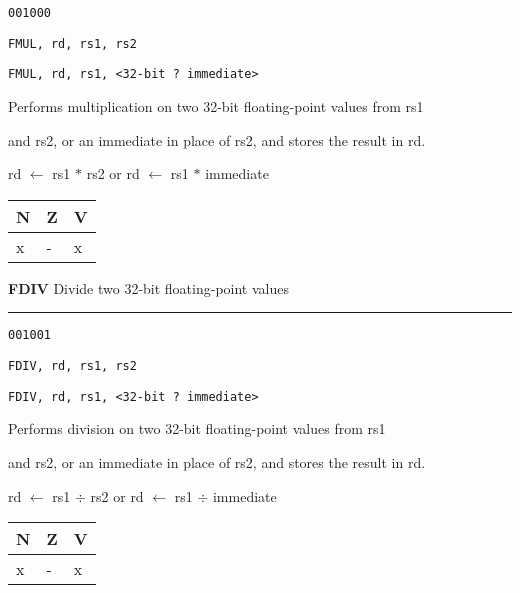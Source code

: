 \documentclass{article}
\begin{document}
{\large
	 \texttt{001000} \par
	\smallbreak
	 \texttt{FMUL, rd, rs1, rs2} \par
	\smallbreak
	 \texttt{FMUL, rd, rs1, <32-bit ? immediate>} \par
	\smallbreak
	 Performs multiplication on two 32-bit floating-point values from rs1 \par
	\makebox[3.5cm][l]{  } and rs2, or an immediate in place of rs2, and stores the result in rd. \par
	\smallbreak
	 rd $\leftarrow$ rs1 $*$ rs2 \quad or \quad rd $\leftarrow$ rs1 $*$ immediate\par
	\smallbreak
	 \begin{tabular}{lll} N \quad & Z \quad & V \\ \hline x & - & x \\ \end{tabular}
}

\bigskip\bigskip

\flushleft
\LARGE\textbf{FDIV} \large \hfill Divide two 32-bit floating-point values

\kern-3pt
\noindent\rule{16.5cm}{0.4pt}
\normalsize

{\large
	 \texttt{001001} \par
	\smallbreak
	 \texttt{FDIV, rd, rs1, rs2} \par
	\smallbreak
	 \texttt{FDIV, rd, rs1, <32-bit ? immediate>} \par
	\smallbreak
	 Performs division on two 32-bit floating-point values from rs1 \par
	\makebox[3.5cm][l]{  } and rs2, or an immediate in place of rs2, and stores the result in rd. \par
	\smallbreak
	 rd $\leftarrow$ rs1 $\div$ rs2 \quad or \quad rd $\leftarrow$ rs1 $\div$ immediate\par
	\smallbreak
	 \begin{tabular}{lll} N \quad & Z \quad & V \\ \hline x & - & x \\ \end{tabular}
}

\bigskip\bigskip
\end{document}
